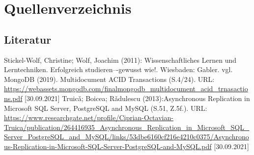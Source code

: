 
  
   \newpage
    \thispagestyle{empty}
   \section{Quellenverzeichnis}
     \subsection{Literatur}
     \renewcommand{\refname}{} %
     \begin{thebibliography}{2} %
         Stickel-Wolf, Christine; Wolf, Joachim (2011): Wissenschaftliches Lernen und Lerntechniken. Erfolgreich studieren–-gewusst wie!. Wiesbaden: Gabler. 
         vgl. MongoDB (2019). Multidocument ACID Transactions (S.4/24). URL: \url{https://webassets.mongodb.com/finalmongodb_multidocument_acid_trnasactions.pdf} [30.09.2021]
         Truicǎ; Boicea; Rǎdulescu (2013):Asynchronous Replication in Microsoft SQL Server, PostgreSQL and MySQL (S.51, Z.5f.). URL: \url{https://www.researchgate.net/profile/Ciprian-Octavian-Truica/publication/264416935_Asynchronous_Replication_in_Microsoft_SQL_Server_PostgreSQL_and_MySQL/links/53dbe6160cf216e4210c0375/Asynchronous-Replication-in-Microsoft-SQL-Server-PostgreSQL-and-MySQL.pdf} [30.09.2021]
      \end{thebibliography}
          
